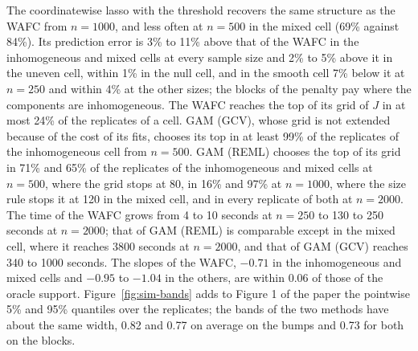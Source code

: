 The coordinatewise lasso with the threshold recovers the same structure as
the WAFC from $n = 1000$, and less often at $n = 500$ in the mixed cell (69\%
against 84\%). Its prediction error is 3\% to 11\% above that of the WAFC in
the inhomogeneous and mixed cells at every sample size and 2\% to 5\% above
it in the uneven cell, within 1\% in the null cell, and in the smooth cell
7\% below it at $n = 250$ and within 4\% at the other sizes; the blocks of
the penalty pay where the components are inhomogeneous. The WAFC reaches the
top of its grid of $J$ in at most 24\% of the replicates of a cell. GAM
(GCV), whose grid is not extended because of the cost of its fits, chooses
its top in at least 99\% of the replicates of the inhomogeneous cell from
$n = 500$. GAM (REML) chooses the top of its grid in 71\% and 65\% of the
replicates of the inhomogeneous and mixed cells at $n = 500$, where the grid
stops at 80, in 16\% and 97\% at $n = 1000$, where the size rule stops it at
120 in the mixed cell, and in every replicate of both at $n = 2000$. The time
of the WAFC grows from 4 to 10 seconds at $n = 250$ to 130 to 250 seconds at
$n = 2000$; that of GAM (REML) is comparable except in the mixed cell, where
it reaches 3800 seconds at $n = 2000$, and that of GAM (GCV) reaches 340 to
1000 seconds. The slopes of the WAFC, $-0.71$ in the inhomogeneous and mixed
cells and $-0.95$ to $-1.04$ in the others, are within 0.06 of those of the
oracle support. Figure~\ref{fig:sim-bands} adds to Figure 1 of the paper the
pointwise 5\% and 95\% quantiles over the replicates; the bands of the two
methods have about the same width, 0.82 and 0.77 on average on the bumps and
0.73 for both on the blocks.








\clearpage


